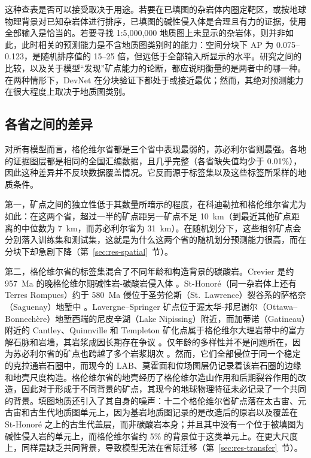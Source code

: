 \documentclass[pdflatex,sn-apa]{sn-jnl}
\begin{document}
这种查表是否可以接受取决于用途。若要在已填图的杂岩体内圈定靶区，或按地球物理背景对已知杂岩体进行排序，已填图的碱性侵入体是合理且有力的证据，使用全部输入是恰当的。若要寻找 1:5,000,000 地质图上未显示的杂岩体，则并非如此，此时相关的预测能力是不含地质图类别时的能力：空间分块下 AP 为 0.075--0.123，是随机排序值的 15--25 倍，但远低于全部输入所显示的水平。研究之间的比较，以及关于模型“发现”矿点能力的论断，都应说明衡量的是两者中的哪一种。在两种情形下，DevNet 在分块验证下都处于或接近最优；然而，其绝对预测能力在很大程度上取决于地质图类别。

\subsection{各省之间的差异}\label{sec:disc-provinces}

对所有模型而言，格伦维尔省都是三个省中表现最弱的，苏必利尔省则最强。各地的证据图层都是相同的全国汇编数据，且几乎完整（各省缺失值均少于 0.01\%），因此这种差异并不反映数据覆盖情况。它反而源于标签集以及这些标签所采样的地质条件。

第一，矿点之间的独立性低于其数量所暗示的程度，在科迪勒拉和格伦维尔省尤为如此：在这两个省，超过一半的矿点距另一矿点不足 10~km（到最近其他矿点距离的中位数为 7~km，而苏必利尔省为 31~km）。在随机划分下，这些相邻矿点会分别落入训练集和测试集，这就是为什么这两个省的随机划分预测能力很高，而在分块下却急剧下降（第~\ref{sec:res-spatial}~节）。

第二，格伦维尔省的标签集混合了不同年龄和构造背景的碳酸岩。Crevier 是约 957~Ma 的晚格伦维尔期碱性岩-碳酸岩侵入体 \citep{Groulier2020}。St-Honoré（同一杂岩体上还有 Terres Rompues）约于 580~Ma 侵位于圣劳伦斯（St.~Lawrence）裂谷系的萨格奈（Saguenay）地堑中 \citep{Neron2018}。Lavergne--Springer 矿点位于渥太华-邦尼谢尔（Ottawa--Bonnech\`ere）地堑西端的尼皮辛湖（Lake Nipissing）附近，而加蒂诺（Gatineau）附近的 Cantley、Quinnville 和 Templeton 矿化点属于格伦维尔大理岩带中的富方解石脉和岩墙，其岩浆成因长期存在争议 \citep{Moecher1997}。仅年龄的多样性并不是问题所在，因为苏必利尔省的矿点也跨越了多个岩浆期次 \citep{Rukhlov2010}。然而，它们全部侵位于同一个稳定的克拉通岩石圈中，而现今的 LAB、莫霍面和位场图层仍记录着该岩石圈的边缘和地壳尺度构造。格伦维尔省的地壳经历了格伦维尔造山作用和后期裂谷作用的改造，因此对于形成于不同背景的矿点，其现今的地球物理特征未必记录了一个共同的背景。填图地质还引入了其自身的噪声：十二个格伦维尔省矿点落在太古宙、元古宙和古生代地质图单元上，因为基岩地质图记录的是改造后的原岩以及覆盖在 St-Honoré 之上的古生代盖层，而非碳酸岩本身；并且其中没有一个位于被填图为碱性侵入岩的单元上，而格伦维尔省约 5\% 的背景位于这类单元上。在更大尺度上，同样是缺乏共同背景，导致模型无法在省际迁移（第~\ref{sec:res-transfer}~节）。
\end{document}
